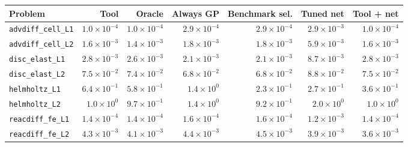 \begin{tabular}{lrrrrrr}
\toprule
Problem & Tool & Oracle & Always GP & Benchmark sel. & Tuned net & Tool + net \\
\midrule
\texttt{advdiff\_cell\_L1} & $1.0\times10^{-4}$ & $1.0\times10^{-4}$ & $2.9\times10^{-4}$ & $2.9\times10^{-4}$ & $2.9\times10^{-3}$ & $1.0\times10^{-4}$ \\
\texttt{advdiff\_cell\_L2} & $1.6\times10^{-3}$ & $1.4\times10^{-3}$ & $1.8\times10^{-3}$ & $1.8\times10^{-3}$ & $5.9\times10^{-3}$ & $1.6\times10^{-3}$ \\
\texttt{disc\_elast\_L1} & $2.8\times10^{-3}$ & $2.6\times10^{-3}$ & $2.1\times10^{-3}$ & $2.1\times10^{-3}$ & $8.7\times10^{-3}$ & $2.8\times10^{-3}$ \\
\texttt{disc\_elast\_L2} & $7.5\times10^{-2}$ & $7.4\times10^{-2}$ & $6.8\times10^{-2}$ & $6.8\times10^{-2}$ & $8.8\times10^{-2}$ & $7.5\times10^{-2}$ \\
\texttt{helmholtz\_L1} & $6.4\times10^{-1}$ & $5.8\times10^{-1}$ & $1.4\times10^{0}$ & $2.3\times10^{-1}$ & $2.7\times10^{-1}$ & $3.6\times10^{-1}$ \\
\texttt{helmholtz\_L2} & $1.0\times10^{0}$ & $9.7\times10^{-1}$ & $1.4\times10^{0}$ & $9.2\times10^{-1}$ & $2.0\times10^{0}$ & $1.0\times10^{0}$ \\
\texttt{reacdiff\_fe\_L1} & $1.4\times10^{-4}$ & $1.4\times10^{-4}$ & $1.6\times10^{-4}$ & $1.6\times10^{-4}$ & $1.2\times10^{-3}$ & $1.4\times10^{-4}$ \\
\texttt{reacdiff\_fe\_L2} & $4.3\times10^{-3}$ & $4.1\times10^{-3}$ & $4.4\times10^{-3}$ & $4.5\times10^{-3}$ & $3.9\times10^{-3}$ & $3.6\times10^{-3}$ \\
\bottomrule
\end{tabular}

